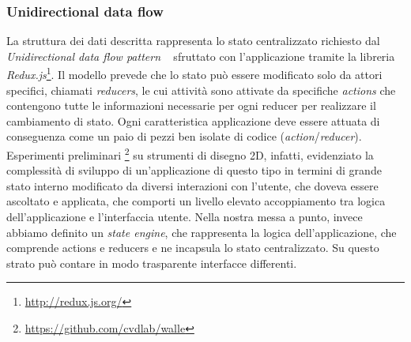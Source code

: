 \subsubsection*{Unidirectional data flow}
\noindent
La struttura dei dati descritta rappresenta lo stato centralizzato richiesto dal \emph{Unidirectional data flow pattern}
~\cite{uniflow} sfruttato con l'applicazione tramite la libreria \emph{Redux.js}\footnote{\url{http://redux.js.org/}}.
Il modello prevede che lo stato può essere modificato solo da attori specifici, chiamati \emph{reducers},
le cui attivit\`a sono attivate da specifiche \emph{actions} che contengono tutte le informazioni necessarie per
ogni reducer per realizzare il cambiamento di stato. Ogni caratteristica applicazione deve essere attuata di conseguenza
come un paio di pezzi ben isolate di codice (\emph{action}/\emph{reducer}). Esperimenti preliminari
\footnote{\url{https://github.com/cvdlab/walle}} su strumenti di disegno 2D, infatti,
evidenziato la complessità di sviluppo di un'applicazione di questo tipo in termini di grande stato interno modificato
da diversi interazioni con l'utente, che doveva essere ascoltato e applicata,
che comporti un livello elevato accoppiamento tra logica dell'applicazione e l'interfaccia utente.
Nella nostra messa a punto, invece abbiamo definito un \emph{state engine}, che rappresenta la logica dell'applicazione,
che comprende actions e reducers e ne incapsula lo stato centralizzato.
Su questo strato può contare in modo trasparente interfacce differenti.


